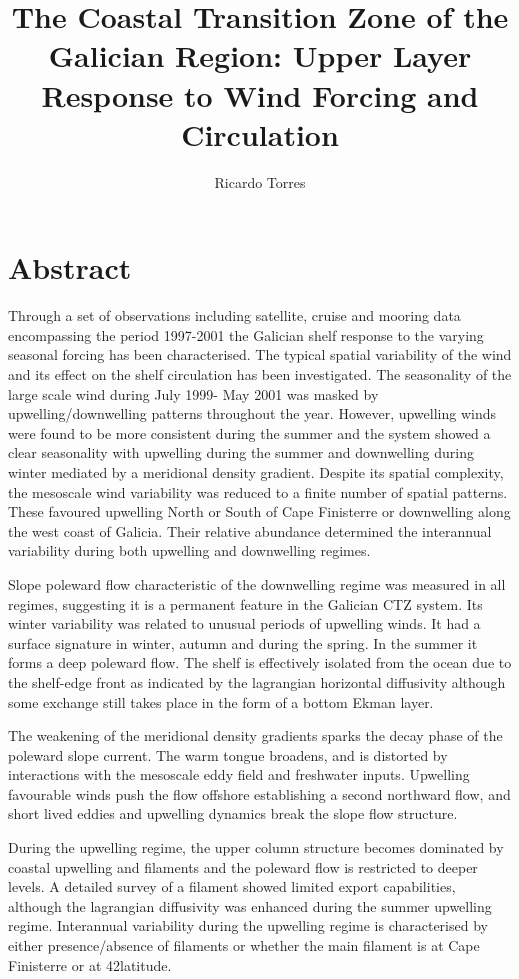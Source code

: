 \documentclass[12pt,twoside]{mythesis}
\title{The Coastal Transition Zone of the Galician Region: Upper Layer Response to Wind Forcing and Circulation}
\author{Ricardo Torres}
\begin{document}
\maketitle

\chapter*{Abstract}


Through a set of observations including satellite, cruise and
mooring data encompassing the period 1997-2001 the Galician shelf
response to the varying seasonal forcing  has been  characterised.
The typical spatial variability of the wind and its effect on the
shelf circulation has been investigated. The seasonality of the
large scale wind during July 1999- May 2001 was masked by
upwelling/downwelling patterns throughout the year. However,
upwelling winds were found to be more consistent during the summer
and the system showed a clear seasonality with upwelling during
the summer and downwelling during winter mediated by a meridional
density gradient. Despite its spatial complexity, the mesoscale
wind variability was reduced to a finite number of spatial
patterns. These favoured upwelling North or South of Cape
Finisterre or downwelling along the west coast of Galicia. Their
relative abundance determined the interannual variability during
both upwelling and downwelling regimes.

Slope poleward flow characteristic of the downwelling regime was
measured in all regimes, suggesting it is a permanent feature in
the Galician CTZ system. Its winter variability was related to
unusual periods of upwelling winds. It had a surface signature in
winter, autumn and during the spring. In the summer it forms a
deep poleward flow. The shelf is effectively isolated from the
ocean due to the shelf-edge front as indicated by the lagrangian
horizontal diffusivity although some exchange still takes place in
the form of a bottom Ekman layer.

The weakening of the meridional density gradients sparks the decay
phase of the poleward slope current. The warm tongue broadens, and
is distorted by interactions with the mesoscale eddy field and
freshwater inputs. Upwelling favourable winds push the flow
offshore establishing a second northward flow, and short lived
eddies and upwelling dynamics break the slope flow structure.

During the upwelling regime, the upper column structure becomes
dominated by coastal upwelling and filaments and the poleward flow
is restricted to deeper levels. A detailed survey of a filament
showed limited export capabilities, although the lagrangian
diffusivity was enhanced during the summer upwelling regime.
Interannual variability during the upwelling regime is
characterised by either presence/absence of filaments or whether
the main filament is at Cape Finisterre or at 42\deg latitude.
\end{document}
